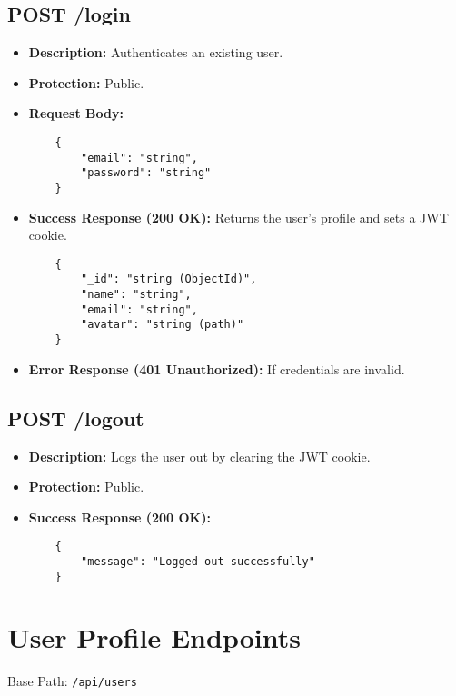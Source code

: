 \subsection{POST /login}
\begin{itemize}
    \item \textbf{Description:} Authenticates an existing user.
    \item \textbf{Protection:} Public.
    \item \textbf{Request Body:}
    \begin{verbatim}
    {
        "email": "string",
        "password": "string"
    }
    \end{verbatim}
    \item \textbf{Success Response (200 OK):} Returns the user's profile and sets a JWT cookie.
    \begin{verbatim}
    {
        "_id": "string (ObjectId)",
        "name": "string",
        "email": "string",
        "avatar": "string (path)"
    }
    \end{verbatim}
    \item \textbf{Error Response (401 Unauthorized):} If credentials are invalid.
\end{itemize}

\subsection{POST /logout}
\begin{itemize}
    \item \textbf{Description:} Logs the user out by clearing the JWT cookie.
    \item \textbf{Protection:} Public.
    \item \textbf{Success Response (200 OK):}
    \begin{verbatim}
    {
        "message": "Logged out successfully"
    }
    \end{verbatim}
\end{itemize}

\section{User Profile Endpoints}
Base Path: \texttt{/api/users}


